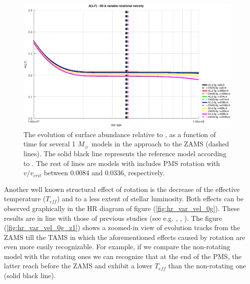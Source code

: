 \documentclass[fleqn,usenatbib]{mnras}
\begin{document}
\begin{figure}
	\includegraphics[width=\columnwidth]{figures/li_var_vel_0_0g_z1.eps}
    \caption {The evolution of surface  abundance relative to , as a function of time for several 1 $M_{\sun}$ models in the approach to the ZAMS (dashed lines). The solid black line represents the reference model according to \citet{Choi2016}. The rest of lines are models with includes PMS rotation with $v/v_{crit}$ between 0.0084 and 0.0336, respectively.}
    \label{fig:li_var_vel_0g_z1}
\end{figure}

Another well known structural effect of rotation is the decrease of the effective temperature ($T_{eff}$) and to a less extent of stellar luminosity. Both effects can be observed graphically in the HR diagram of figure (\ref{fig:hr_var_vel_0g}). These results are in line with those of previous studies (see e.g. \citet{Eggenberger2012}, \citet{Piau2001}, \citet{Pinsonneault1989}). The figure (\ref{fig:hr_var_vel_0g_z1}) shows a zoomed-in view of evolution tracks from the ZAMS till the TAMS in which the aforementioned effects caused by rotation are even more easily recognizable. For example, if we compare the non-rotating model with the rotating ones we can recognize that at the end of the PMS, the latter reach before the ZAMS and exhibit a lower $T_{eff}$ than the non-rotating one (solid black line).\par
\end{document}
